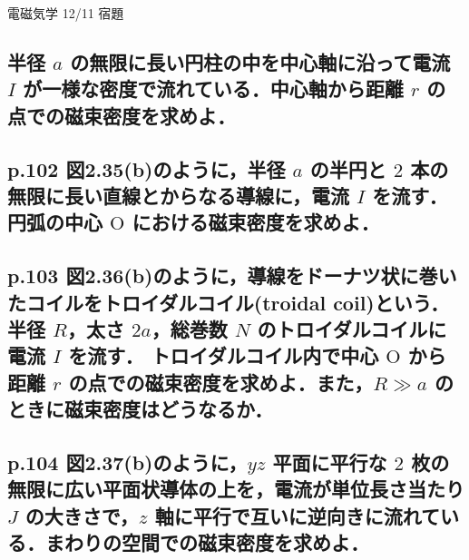 \documentclass[a4paper, 12pt]{bxjsarticle}
\begin{document}
\begin{center}
    \begin{huge}
        電磁気学 12/11 宿題
    \end{huge}
\end{center}

\subsection{半径 \(a\) の無限に長い円柱の中を中心軸に沿って電流 \(I\) が一様な密度で流れている．中心軸から距離 \(r\) の点での磁束密度を求めよ．}
\subsection{p.102 図2.35(b)のように，半径 \(a\) の半円と \(2\) 本の無限に長い直線とからなる導線に，電流 \(I\) を流す．円弧の中心 \(\mathrm{O}\) における磁束密度を求めよ．}
\subsection{p.103 図2.36(b)のように，導線をドーナツ状に巻いたコイルをトロイダルコイル(troidal coil)という．半径 \(R\)，太さ \(2a\)，総巻数 \(N\) のトロイダルコイルに電流 \(I\) を流す．%
トロイダルコイル内で中心 \(\mathrm{O}\) から距離 \(r\) の点での磁束密度を求めよ．また，\(R \gg a\) のときに磁束密度はどうなるか．}
\subsection{p.104 図2.37(b)のように，\(yz\) 平面に平行な \(2\) 枚の無限に広い平面状導体の上を，電流が単位長さ当たり \(J\) の大きさで，\(z\) 軸に平行で互いに逆向きに流れている．まわりの空間での磁束密度を求めよ．}
\end{document}
